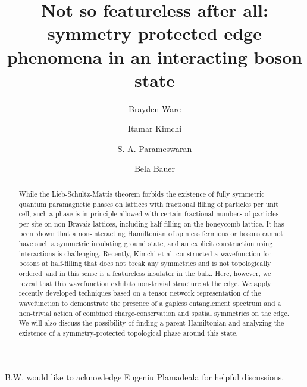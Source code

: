 \documentclass[twocolumn,english,prb,showpacs,superscriptaddress]{revtex4-1}
\begin{document}
\title{Not so featureless after all: \\ symmetry protected edge phenomena in an interacting boson state}

\author{Brayden Ware}

\author{Itamar Kimchi}

\author{S. A. Parameswaran}

\author{Bela Bauer}

\begin{abstract}
While the Lieb-Schultz-Mattis theorem forbids the existence of fully
symmetric quantum paramagnetic phases on lattices with fractional
filling of particles per unit cell, such a phase is in principle
allowed with certain fractional numbers of particles per site on
non-Bravais lattices, including half-filling on the honeycomb lattice.
It has been shown that a non-interacting Hamiltonian of spinless
fermions or bosons cannot have such a symmetric insulating ground
state, and an explicit construction using interactions is challenging.
Recently, Kimchi et al. constructed a wavefunction for bosons at
half-filling that does not break any symmetries and is not
topologically ordered--and in this sense is a featureless insulator in
the bulk. Here, however, we reveal that this wavefunction exhibits
non-trivial structure at the edge. We apply recently developed
techniques based on a tensor network representation of the
wavefunction to demonstrate the presence of a gapless entanglement
spectrum and a non-trivial action of combined charge-conservation and
spatial symmetries on the edge. We will also discuss the possibility
of finding a parent Hamiltonian and analyzing the existence of a
symmetry-protected topological phase around this state.
\end{abstract}
\maketitle









\acknowledgements
B.W. would like to acknowledge Eugeniu Plamadeala for helpful discussions.


\end{document}
